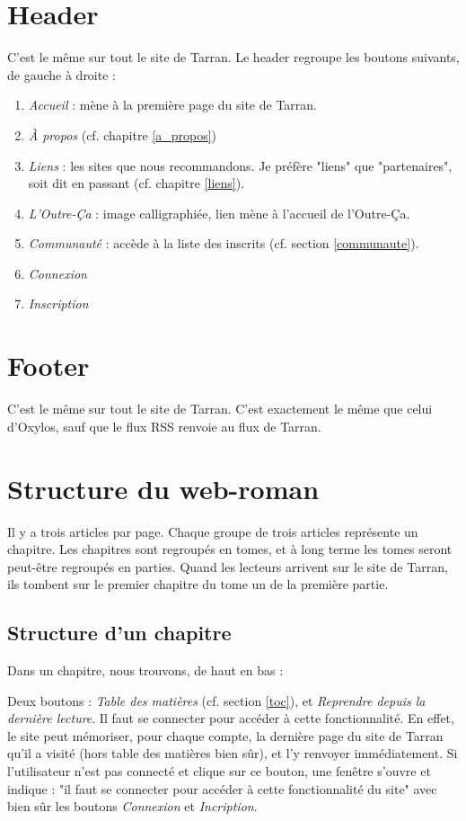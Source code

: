 \documentclass[french]{report}
\theoremstyle{plain}
\begin{document}
	\section{Header}
		C'est le même sur tout le site de Tarran.
		Le header regroupe les boutons suivants, de gauche à droite :
		\begin{enumerate}
			\item \emph{Accueil} : mène à la première page  du site de Tarran.
			\item \emph{À propos} (cf. chapitre \ref{a_propos})
			\item \emph{Liens} : les sites que nous recommandons. Je préfère "liens" que "partenaires", soit dit en passant (cf. chapitre \ref{liens}).
			\item \emph{L'Outre-Ça} : image calligraphiée, lien mène à l'accueil de l'Outre-Ça.
			\item \emph{Communauté} : accède à la liste des inscrits (cf. section \ref{communaute}).
			\item \emph{Connexion} 
			\item \emph{Inscription} 
		\end{enumerate}

	\section{Footer}
		C'est le même sur tout le site de Tarran. C'est exactement le même que celui d'Oxylos, sauf que le flux RSS renvoie au flux de Tarran.

	\section{Structure du web-roman}
		Il y a trois articles par page. Chaque groupe de trois articles représente un chapitre. Les chapitres sont regroupés en tomes, et à long terme les tomes seront peut-être regroupés en parties.
		Quand les lecteurs arrivent sur le site de Tarran, ils tombent sur le premier chapitre du tome un de la première partie. 

		\subsection{Structure d'un chapitre}
			Dans un chapitre, nous trouvons, de haut en bas :

			Deux boutons : \emph{Table des matières} (cf. section \ref{toc}), et \emph{Reprendre depuis la dernière lecture}. Il faut se connecter pour accéder à cette fonctionnalité. En effet, le site peut mémoriser, pour chaque compte, la dernière page du site de Tarran qu'il a visité (hors table des matières bien sûr), et l'y renvoyer immédiatement. Si l'utilisateur n'est pas connecté et clique sur ce bouton, une fenêtre s'ouvre et indique : "il faut se connecter pour accéder à cette fonctionnalité du site" avec bien sûr les boutons \emph{Connexion} et \emph{Incription}. 
\end{document}

